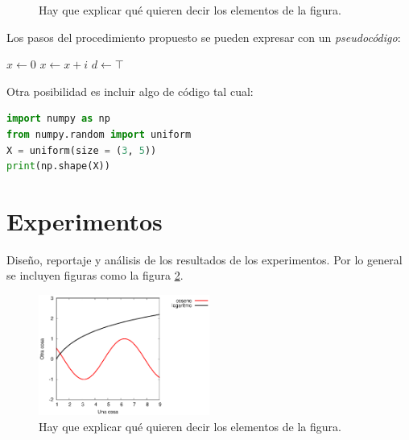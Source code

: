 \documentclass[a0]{sciposter} %
\begin{document}
\begin{multicols}{2}
\begin{figure}
\captionsetup{type=figure} %
\setcounter{figure}{0} %
\begin{center}
\end{center}
\caption{Hay que explicar qué quieren decir los elementos de la figura.}
\label{diag}
\end{figure}

Los pasos del procedimiento propuesto se pueden expresar con un {\em pseudocódigo}:

\begin{algorithmic}[1]
\State $x \leftarrow 0$
	\State $x \leftarrow x + i$
\EndFor
{}
    \State $d \leftarrow \top$
\EndIf
\end{algorithmic} 

Otra posibilidad es incluir algo de código tal cual:
\begin{lstlisting}[language=Python, caption=Procedimiento del segundo paso]
import numpy as np
from numpy.random import uniform
X = uniform(size = (3, 5))
print(np.shape(X))
\end{lstlisting}

\section{Experimentos}

Diseño, reportaje y análisis de los resultados de los
experimentos. Por lo general se incluyen figuras como la figura
\ref{curvas}.

\begin{figure}
\setcounter{figure}{1} %
\captionsetup{type=figure} %
\begin{center}
   \includegraphics[width=0.5\textwidth]{curvas.eps}
   \end{center}
    \caption{Hay que explicar qué quieren decir los elementos de la figura.}
    \label{curvas}
\end{figure}


\end{multicols}
\end{document}
